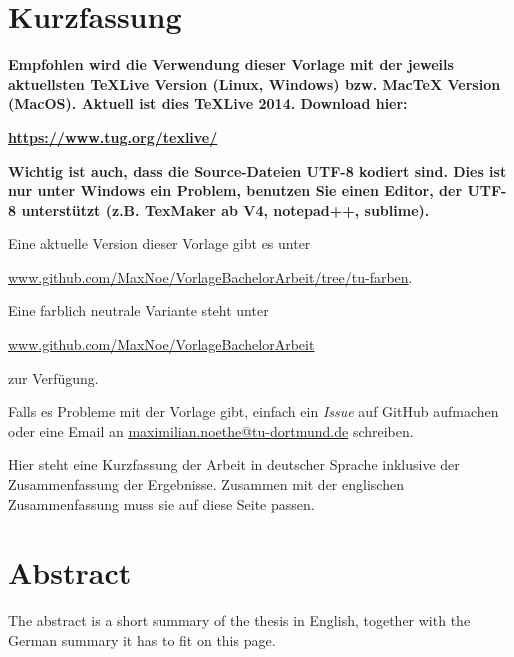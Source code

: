 \thispagestyle{plain}
\section*{Kurzfassung}

\textbf{\large Empfohlen wird die Verwendung dieser Vorlage mit der jeweils aktuellsten TeXLive Version (Linux, Windows) bzw. MacTeX Version (MacOS).
Aktuell ist dies TeXLive 2014. Download hier: 
}

\href{https://www.tug.org/texlive/}{\textbf{\large https://www.tug.org/texlive/}}

\textbf{\large
Wichtig ist auch, dass die Source-Dateien UTF-8 kodiert sind. Dies
ist nur unter Windows ein Problem, benutzen Sie einen Editor, der
UTF-8 unterstützt (z.B. TexMaker ab V4, notepad++, sublime).
}

Eine aktuelle Version dieser Vorlage gibt es unter 

\href{https://github.com/MaxNoe/VorlageBachelorArbeit/tree/tu-farben}{www.github.com/MaxNoe/VorlageBachelorArbeit/tree/tu-farben}.

Eine farblich neutrale Variante steht unter  

\href{https://github.com/MaxNoe/VorlageBachelorArbeit}{www.github.com/MaxNoe/VorlageBachelorArbeit}

zur Verfügung.

Falls es Probleme mit der Vorlage gibt, einfach ein \emph{Issue} auf GitHub aufmachen oder eine Email an
\href{mailto:maximilian.noethe@tu-dortmund.de}{maximilian.noethe@tu-dortmund.de} schreiben.


Hier steht eine Kurzfassung der Arbeit in deutscher Sprache inklusive der Zusammenfassung der
Ergebnisse.
Zusammen mit der englischen Zusammenfassung muss sie auf diese Seite passen.

\section*{Abstract}

The abstract is a short summary of the thesis in English, together with the German summary it has to fit on this page.
